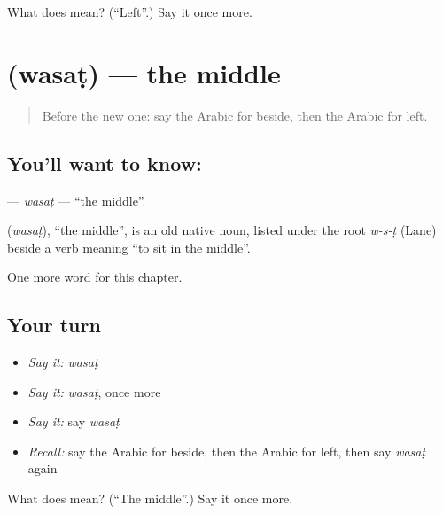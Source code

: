\begin{tcolorbox}[breakable,colback=teal!4,colframe=teal!35!black,title={Before you move on}]
What does  mean? (\textquotedblleft{}Left\textquotedblright{}.) Say it once more.
\end{tcolorbox}
\section[\texorpdfstring{\ar{وسط} (wasaṭ)}{وسط (wasaṭ)}]{ (wasaṭ) — the middle}

\label{lesson:AR-C103-wasat}



\begin{quote}
Before the new one: say the Arabic for beside, then the Arabic for left.
\end{quote}

\subsection*{You'll want to know: }
\textbf{} — \emph{wasaṭ} — \textquotedblleft{}the middle\textquotedblright{}.

\begin{cousinweb}
\textbf{} (\emph{wasaṭ}), \textquotedblleft{}the middle\textquotedblright{}, is an old native noun, listed under the root \emph{w-s-ṭ} (Lane) beside a verb meaning \textquotedblleft{}to sit in the middle\textquotedblright{}.
\end{cousinweb}

\begin{grammarlens}[title={What you've built}]
One more word for this chapter.
\end{grammarlens}

\subsection*{Your turn}
\begin{itemize}
\raggedright
  \item \emph{Say it:} \emph{wasaṭ}
  \item \emph{Say it:} \emph{wasaṭ}, once more
  \item \emph{Say it:} say \emph{wasaṭ}
  \item \emph{Recall:} say the Arabic for beside, then the Arabic for left, then say \emph{wasaṭ} again
\end{itemize}

\begin{tcolorbox}[breakable,colback=teal!4,colframe=teal!35!black,title={Before you move on}]
What does  mean? (\textquotedblleft{}The middle\textquotedblright{}.) Say it once more.
\end{tcolorbox}
